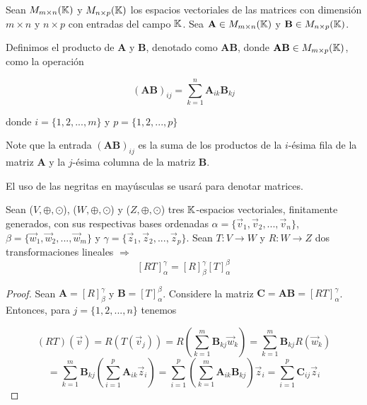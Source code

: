 \begin{definition} 
    Sean $M_{m\times n}(\mathbb{K})$ y $M_{n \times p}(\mathbb{K})$ los espacios vectoriales de las matrices con dimensión $m \times n$ y $n \times p$ con entradas del campo $\mathbb{K}$. Sea $\textbf{A} \in M_{m\times n}(\mathbb{K})$ y $\textbf{B} \in M_{n\times p}(\mathbb{K})$. 
    
    Definimos el producto de $\textbf{A}$ y $\textbf{B}$, denotado como $\textbf{AB}$, donde $\textbf{AB} \in M_{m \times p}(\mathbb{K})$, como la operación
    
    $$(\textbf{AB})_{ij}=\sum_{k=1}^n \textbf{A}_{ik}\textbf{B}_{kj} $$ 

    donde $i=\{1,2,...,m\}$ y $ p=\{1,2,...,p\}$
    
    Note que la entrada $(\textbf{AB})_{ij}$ es la suma de los productos de la $i$-ésima fila de la matriz $\textbf{A}$ y la $j$-ésima columna de la matriz $\textbf{B}$.
\end{definition}

\begin{notation}
    El uso de las negritas en mayúsculas se usará para denotar matrices.
\end{notation}

\begin{theorem}
\label{mat_asoc_comp}
    Sean ($V, \oplus, \odot$), ($W, \oplus, \odot$) y ($Z, \oplus, \odot$) tres $\mathbb{K}$-espacios vectoriales, finitamente generados, con sus respectivas bases ordenadas $\alpha=\{\vec{v}_1,\vec{v}_2,...,\vec{v}_n\}$, $\beta=\{\vec{w}_1,\vec{w}_2,...,\vec{w}_m\}$ y $\gamma=\{\vec{z}_1,\vec{z}_2,...,\vec{z}_p\}$. Sean $T:V \to W$ y $R:W \to Z$ dos transformaciones lineales $\Rightarrow$ $$[RT]_{\alpha}^{\gamma}=[R]_{\beta}^{\gamma}[T]_{\alpha}^{\beta}$$
\end{theorem}

\begin{proof}
    Sean $\textbf{A}=[R]_{\beta}^{\gamma}$ y $\textbf{B}=[T]_{\alpha}^{\beta}$. Considere la matriz $\textbf{C}=\textbf{AB}=[RT]_{\alpha}^{\gamma}$. Entonces, para $j=\{1,2,...,n\}$ tenemos 

    $$ (RT)(\vec{v})=R(T(\vec{v}_j))= R\left( \sum_{k=1}^m \textbf{B}_{kj}\vec{w}_k \right ) = \sum_{k=1}^m \textbf{B}_{kj} R(\vec{w}_k)$$
    $$= \sum_{k=1}^m \textbf{B}_{kj} \left( \sum_{i=1}^p \textbf{A}_{ik} \vec{z}_i \right) = \sum_{i=1}^p \left(\sum_{k=1}^m \textbf{A}_{ik}\textbf{B}_{kj} \right) \vec{z}_i = \sum_{i=1}^p \textbf{C}_{ij}\vec{z}_i$$

\end{proof}

